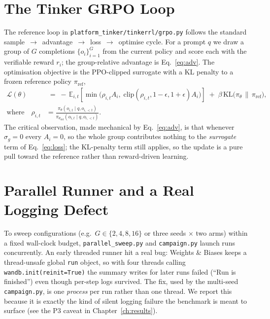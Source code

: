 \documentclass[12pt,a4paper]{report}
\begin{document}
\section{The Tinker GRPO Loop}
\label{sec:impl-loop}


The reference loop in \texttt{platform_tinker/tinkerrl/grpo.py} follows the standard
sample~$\rightarrow$~advantage~$\rightarrow$~loss~$\rightarrow$~optimise cycle. For a
prompt $q$ we draw a group of $G$ completions $\{o_i\}_{i=1}^{G}$ from the current
policy and score each with the verifiable reward $r_i$; the group-relative advantage
is Eq.~\eqref{eq:adv}. The optimisation objective is the PPO-clipped surrogate with
a KL penalty to a frozen reference policy $\pi_{\mathrm{ref}}$,
\begin{align}
\mathcal{L}(\theta) &\;=\;
-\,\mathbb{E}_{i,t}\!\left[
\min\!\big(\rho_{i,t}A_i,\;
\mathrm{clip}(\rho_{i,t},1-\epsilon,1+\epsilon)A_i\big)
\right]
\;+\; \beta\, \mathrm{KL}\!\big(\pi_\theta \,\|\, \pi_{\mathrm{ref}}\big),
\label{eq:loss}\\[0.2em]
\text{where}\quad
\rho_{i,t} &=\frac{\pi_\theta(o_{i,t}\mid q,o_{i,<t})}{\pi_{\theta_{\mathrm{old}}}(o_{i,t}\mid q,o_{i,<t})}.
\nonumber
\end{align}
The critical observation, made mechanical by Eq.~\eqref{eq:adv}, is that whenever
$\sigma_g = 0$ every $A_i = 0$, so the whole group contributes nothing to the
\emph{surrogate} term of Eq.~\eqref{eq:loss}; the KL-penalty term still applies, so
the update is a pure pull toward the reference rather than reward-driven learning.

\section{Parallel Runner and a Real Logging Defect}
\label{sec:runner}
To sweep configurations (e.g.\ $G \in \{2,4,8,16\}$ or three seeds $\times$ two arms)
within a fixed wall-clock budget, \texttt{parallel\_sweep.py} and \texttt{campaign.py}
launch runs concurrently. An early threaded runner hit a real bug: Weights \& Biases
keeps a thread-unsafe global \texttt{run} object, so with four threads calling
\texttt{wandb.init(reinit=True)} the summary writes for later runs failed (``Run is
finished'') even though per-step logs survived. The fix, used by the multi-seed
\texttt{campaign.py}, is one \emph{process} per run rather than one thread. We report
this because it is exactly the kind of silent logging failure the benchmark is meant
to surface (see the P3 caveat in Chapter~\ref{ch:results}).
\end{document}
